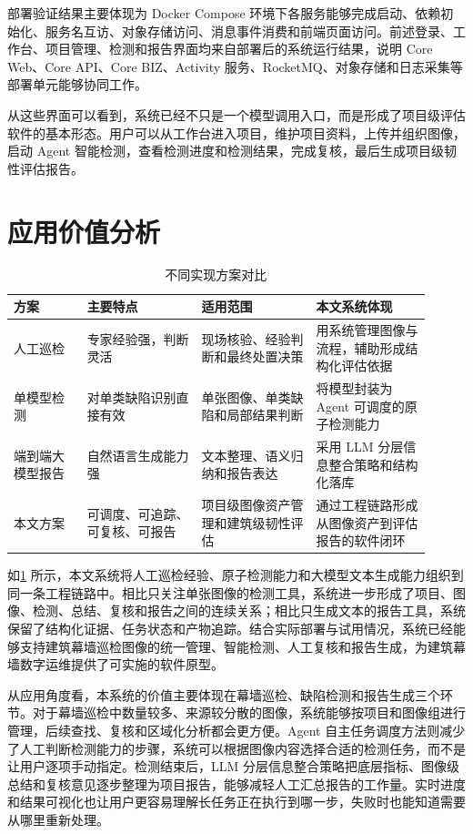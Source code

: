 部署验证结果主要体现为 Docker Compose 环境下各服务能够完成启动、依赖初始化、服务名互访、对象存储访问、消息事件消费和前端页面访问。前述登录、工作台、项目管理、检测和报告界面均来自部署后的系统运行结果，说明 Core Web、Core API、Core BIZ、Activity 服务、RocketMQ、对象存储和日志采集等部署单元能够协同工作。

从这些界面可以看到，系统已经不只是一个模型调用入口，而是形成了项目级评估软件的基本形态。用户可以从工作台进入项目，维护项目资料，上传并组织图像，启动 Agent 智能检测，查看检测进度和检测结果，完成复核，最后生成项目级韧性评估报告。

\section{应用价值分析}
\label{sec:validation-application-value-analysis}

\begin{table}[!htb]
  \caption{不同实现方案对比}\label{tab:solution-comparison}
  \centering
  \begin{tabular}{@{}p{0.16\linewidth}p{0.25\linewidth}p{0.25\linewidth}p{0.25\linewidth}@{}} \toprule
    \textbf{方案} & \textbf{主要特点} & \textbf{适用范围} & \textbf{本文系统体现} \\ \midrule
    人工巡检 & 专家经验强，判断灵活 & 现场核验、经验判断和最终处置决策 & 用系统管理图像与流程，辅助形成结构化评估依据 \\
    单模型检测 & 对单类缺陷识别直接有效 & 单张图像、单类缺陷和局部结果判断 & 将模型封装为 Agent 可调度的原子检测能力 \\
    端到端大模型报告 & 自然语言生成能力强 & 文本整理、语义归纳和报告表达 & 采用 LLM 分层信息整合策略和结构化落库 \\
    本文方案 & 可调度、可追踪、可复核、可报告 & 项目级图像资产管理和建筑级韧性评估 & 通过工程链路形成从图像资产到评估报告的软件闭环 \\ \bottomrule
  \end{tabular}
\end{table}

如\cref{tab:solution-comparison} 所示，本文系统将人工巡检经验、原子检测能力和大模型文本生成能力组织到同一条工程链路中。相比只关注单张图像的检测工具，系统进一步形成了项目、图像、检测、总结、复核和报告之间的连续关系；相比只生成文本的报告工具，系统保留了结构化证据、任务状态和产物追踪。结合实际部署与试用情况，系统已经能够支持建筑幕墙巡检图像的统一管理、智能检测、人工复核和报告生成，为建筑幕墙数字运维提供了可实施的软件原型。

从应用角度看，本系统的价值主要体现在幕墙巡检、缺陷检测和报告生成三个环节。对于幕墙巡检中数量较多、来源较分散的图像，系统能够按项目和图像组进行管理，后续查找、复核和区域化分析都会更方便。Agent 自主任务调度方法则减少了人工判断检测能力的步骤，系统可以根据图像内容选择合适的检测任务，而不是让用户逐项手动指定。检测结束后，LLM 分层信息整合策略把底层指标、图像级总结和复核意见逐步整理为项目报告，能够减轻人工汇总报告的工作量。实时进度和结果可视化也让用户更容易理解长任务正在执行到哪一步，失败时也能知道需要从哪里重新处理。


